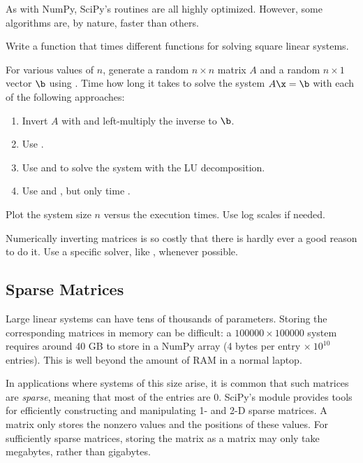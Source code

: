 As with NumPy, SciPy's routines are all highly optimized.
However, some algorithms are, by nature, faster than others.

\begin{problem} %
Write a function that times different  functions for solving square linear systems.

For various values of $n$, generate a random $n \times n$ matrix $A$ and a random $n \times 1$ vector $\b$ using .
Time how long it takes to solve the system $A\x = \b$ with each of the following approaches:
%
\begin{enumerate}
\item Invert $A$ with  and left-multiply the inverse to $\b$.
\item Use .
\item Use  and  to solve the system with the LU decomposition.
\item Use  and , but only time .
\end{enumerate}
%
Plot the system size $n$ versus the execution times.
Use log scales if needed.
\end{problem}

\begin{info}
Numerically inverting matrices is so costly that there is hardly ever a good reason to do it.
Use a specific solver, like , whenever possible.
\end{info}

\subsection*{Sparse Matrices} %

Large linear systems can have tens of thousands of parameters.
Storing the corresponding matrices in memory can be difficult: a $100000 \times 100000$ system requires around 40 GB to store in a NumPy array (4 bytes per entry $\times\ 10^{10}$ entries).
This is well beyond the amount of RAM in a normal laptop.

In applications where systems of this size arise, it is common that such matrices are \emph{sparse}, meaning that most of the entries are $0$.
SciPy's  module provides tools for efficiently constructing and manipulating 1- and 2-D sparse matrices.
A  matrix only stores the nonzero values and the positions of these values.
For sufficiently sparse matrices, storing the matrix as a  matrix may only take megabytes, rather than gigabytes.

